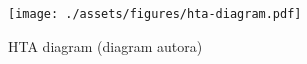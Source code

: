 \begin{landscape}
    \begin{figure}[p]
        \centering
        \texttt{[image: ./assets/figures/hta-diagram.pdf]}
        \captionsetup{justification=centering}
        \caption[HTA diagram]{HTA diagram (diagram autora)}
        \label{fig:hta}
    \end{figure}
\end{landscape}

